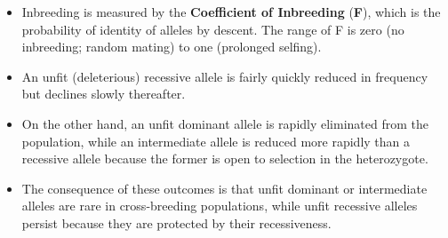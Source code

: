 \documentclass[11pt,dvipsnames,ignorenonframetext,aspectratio=169]{beamer}
\providecommand{\tightlist}{%
  \setlength{\itemsep}{0pt}\setlength{\parskip}{0pt}}
\begin{document}
\begin{frame}{}
\protect\hypertarget{section}{}
\begin{itemize}
\tightlist
\item
  Inbreeding is measured by the \textbf{Coefficient of Inbreeding}
  (\textbf{F}), which is the probability of identity of alleles by
  descent. The range of F is zero (no inbreeding; random mating) to one
  (prolonged selfing).
\item
  An unfit (deleterious) recessive allele is fairly quickly reduced in
  frequency but declines slowly thereafter.
\item
  On the other hand, an unfit dominant allele is rapidly eliminated from
  the population, while an intermediate allele is reduced more rapidly
  than a recessive allele because the former is open to selection in the
  heterozygote.
\item
  The consequence of these outcomes is that unfit dominant or
  intermediate alleles are rare in cross-breeding populations, while
  unfit recessive alleles persist because they are protected by their
  recessiveness.
\end{itemize}
\end{frame}
\end{document}
